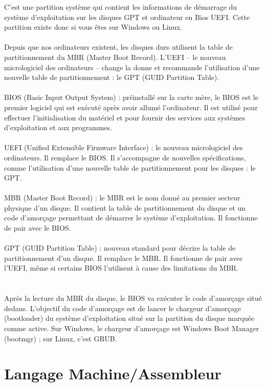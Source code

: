 \documentclass[a4paper,12pt,openany]{book}
\begin{document}
C'est une partition système qui contient les informations de démarrage du système d'exploitation sur les disques GPT et ordinateur en Bios UEFI.
Cette partition existe donc si vous êtes sur Windows ou Linux.\\
\\
Depuis que nos ordinateurs existent, les disques durs utilisent la table de partitionnement du MBR (Master Boot Record). L’UEFI – le nouveau micrologiciel des ordinateurs – change la donne et recommande l’utilisation d’une nouvelle table de partitionnement : le GPT (GUID Partition Table).\\
\\
BIOS (Basic Input Output System) : préinstallé sur la carte mère, le BIOS est le premier logiciel qui est exécuté après avoir allumé l’ordinateur. Il est utilisé pour effectuer l’initialisation du matériel et pour fournir des services aux systèmes d’exploitation et aux programmes. \\
\\
UEFI (Unified Extensible Firmware Interface) : le nouveau micrologiciel des ordinateurs. Il remplace le BIOS. Il s’accompagne de nouvelles spécifications, comme l’utilisation d’une nouvelle table de partitionnement pour les disques : le GPT.\\
\\
MBR (Master Boot Record) : le MBR est le nom donné au premier secteur physique d’un disque. Il contient la table de partitionnement du disque et un code d’amorçage permettant de démarrer le système d’exploitation. Il fonctionne de pair avec le BIOS.\\
\\
GPT (GUID Partition Table) : nouveau standard pour décrire la table de partitionnement d’un disque. Il remplace le MBR. Il fonctionne de pair avec l’UEFI, même si certains BIOS l’utilisent à cause des limitations du MBR.\\
\\
\\
Après la lecture du MBR du disque, le BIOS va exécuter le code d’amorçage situé dedans. L’objectif du code d’amorçage est de lancer le chargeur d’amorçage (bootloader) du système d’exploitation situé sur la partition du disque marquée comme active. Sur Windows, le chargeur d’amorçage est Windows Boot Manager (bootmgr) ; sur Linux, c’est GRUB.

\chapter{Langage Machine/Assembleur}
\end{document}
